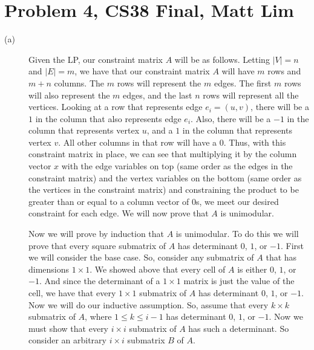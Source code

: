 \documentclass{article}
\begin{document}
\section*{Problem 4, CS38 Final, Matt Lim}
\begin{description}
    \item[(a)] Given the LP, our constraint matrix $A$ will be as follows. Letting
        $|V| = n$ and $|E| = m$, we have that our constraint matrix $A$ will
        have $m$ rows and $m + n$ columns. The $m$ rows will represent the $m$
        edges. The first $m$ rows will also represent the $m$ edges, and the
        last $n$ rows will represent all the vertices. Looking at a
        row that represents edge $e_i = (u,v)$, there will be a $1$ in the
        column that also represents edge $e_i$. Also, there will be a $-1$ in
        the column that represents vertex $u$, and a $1$ in the column that
        represents vertex $v$. All other columns in that row will have a $0$.
        Thus, with this constraint matrix in place, we
        can see that multiplying it by the column vector $x$ with the edge
        variables on top (same order as the edges in the constraint matrix) and
        the vertex variables on the bottom (same order as the vertices in the
        constraint matrix) and constraining the product to be greater than or
        equal to a column vector of $0$s, we meet our desired constraint for
        each edge. We will now prove that $A$ is unimodular.

        Now we will prove by induction that $A$ is unimodular. To do this we
        will prove that every square submatrix of $A$ has determinant $0$, $1$,
        or $-1$.
        First we will consider the base case. So, consider any submatrix of $A$
        that has dimensions $1 \times 1$. We showed above that every cell of $A$
        is either $0$, $1$, or $-1$. And since the determinant of a $1 \times 1$
        matrix is just the value of the cell, we have that every $1 \times 1$
        submatrix of $A$ has determinant $0$, $1$, or $-1$. Now we will do our inductive
        assumption. So, assume that every $k \times k$ submatrix of
        $A$, where $1 \le k \le i - 1$ has determinant $0$, $1$, or $-1$.
        Now we must show that every $i \times i$ submatrix of
        $A$ has such a determinant. So consider an arbitrary $i \times i$
        submatrix $B$ of $A$.


\end{description}
\end{document}
